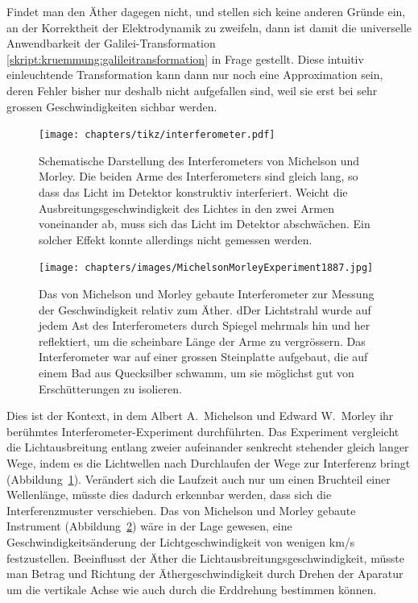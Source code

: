 Findet man den Äther dagegen nicht, und stellen sich keine anderen Gründe
ein, an der Korrektheit der Elektrodynamik zu zweifeln, dann ist damit
die universelle Anwendbarkeit der Galilei-Transformation 
\eqref{skript:kruemmung:galileitransformation} in Frage gestellt.
Diese intuitiv einleuchtende Transformation kann dann nur noch eine
Approximation sein, deren Fehler bisher nur deshalb nicht aufgefallen
sind, weil sie erst bei sehr grossen Geschwindigkeiten sichbar werden.

\begin{figure}
\centering
\texttt{[image: chapters/tikz/interferometer.pdf]}
\caption{Schematische Darstellung des Interferometers von Michelson und Morley.
Die beiden Arme des Interferometers sind gleich lang, so dass das Licht
im Detektor konstruktiv interferiert.
Weicht die Ausbreitungsgeschwindigkeit des Lichtes in den zwei Armen
voneinander ab, muss sich das Licht im Detektor abschwächen.
Ein solcher Effekt konnte allerdings nicht gemessen werden.
\label{skript:speziell:interferometerprinzip}}
\end{figure}

\begin{figure}
\centering
\texttt{[image: chapters/images/MichelsonMorleyExperiment1887.jpg]}
\caption{Das von Michelson und Morley gebaute Interferometer zur Messung
der Geschwindigkeit relativ zum Äther.
dDer Lichtstrahl wurde auf jedem Ast des Interferometers durch Spiegel
mehrmals hin und her reflektiert, um die scheinbare Länge der Arme
zu vergrössern.
Das Interferometer war auf einer grossen Steinplatte aufgebaut, die auf einem
Bad aus Quecksilber schwamm, um sie möglichst gut von Erschütterungen zu
isolieren.
\label{MMinterferometer}}
\end{figure}
Dies ist der Kontext, in dem Albert A.~Michelson und Edward W.~Morley
ihr berühmtes Interfero\-meter-Experiment durchführten.
Das Experiment vergleicht die Lichtausbreitung entlang zweier aufeinander
senkrecht stehender gleich langer Wege, indem es die Lichtwellen nach 
Durchlaufen der Wege zur Interferenz bringt
(Abbildung~\ref{skript:speziell:interferometerprinzip}).
Verändert sich die Laufzeit auch nur um einen Bruchteil einer Wellenlänge,
müsste dies dadurch erkennbar werden, dass sich die Interferenzmuster
verschieben.
Das von Michelson und Morley gebaute Instrument
(Abbildung~\ref{MMinterferometer}) wäre in der Lage
gewesen, eine Geschwindigkeitsänderung der Lichtgeschwindigkeit von
wenigen km/s festzustellen.
Beeinflusst der Äther die Lichtausbreitungsgeschwindigkeit, müsste 
man Betrag und Richtung der Äthergeschwindigkeit durch Drehen der
Aparatur um die vertikale Achse wie auch durch die Erddrehung
bestimmen können.

